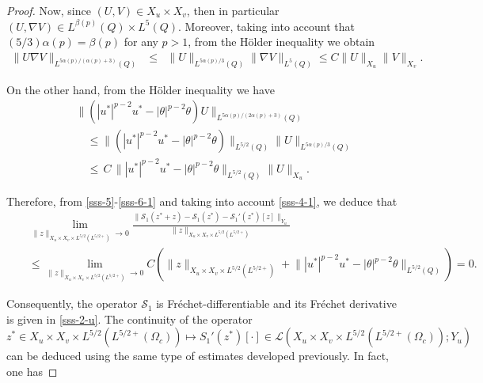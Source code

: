 \documentclass[10pt,a4paper]{amsart}
\begin{document}
\begin{proof}
 Now, since $(U, V)\in X_u\times X_v$, then in particular $(U,\nabla V)\in L^{\beta(p)}(Q)\times L^5(Q)$. 
 Moreover, taking into account that $(5/3)\alpha(p)=\beta(p)$ for any $p>1$, 
 from the H\"older inequality we obtain
\begin{eqnarray}
\|U\nabla V \|_{ L^{5\alpha(p)/(\alpha(p)+3)}(Q)}
&\leq& 
\|U\|_{L^{5\alpha(p)/3}(Q)}\|\nabla V\|_{L^{5}(Q)}
\le C\|U\|_{{X}_{ u}}\|V\|_{{X}_{ v}}.
\label{sss-6}
\end{eqnarray}


On the other hand, 
from the H\"older inequality we have
%
\begin{eqnarray}
&&
\|( |u^*|^{p-2} u^* - |\theta|^{p-2}\theta )U\|_{L^{5\alpha(p)/(2\alpha(p)+3)}(Q)}
 \nonumber \\
&& \quad \le \|( |u^*|^{p-2} u^* - |\theta|^{p-2}\theta )\|_{L^{5/2}(Q)} 
 \|U\|_{L^{5\alpha(p)/3}(Q)}
\nonumber \\
 &&\quad \le   \,  C \,  \| |u^*|^{p-2} u^* - |\theta|^{p-2}\theta \|_{L^{5/2}(Q)}\|U\|_{X_u}.
\label{sss-6-1}
\end{eqnarray}

%
Therefore, from \eqref{sss-5}-\eqref{sss-6-1}  
and taking into account \eqref{sss-4-1}, we deduce that
\begin{eqnarray*}
&&\lim_{\| z \|_{{X}_{u}\times {X}_{v}
\times L^{5/2}(L^{5/2+})} \to0}
\frac{\|\mathcal{S}_1(z^*+z)-\mathcal{S}_1(z^*)-\mathcal{S}_1'(z^*)[z]\|_{Y_u}}
{\|z \|_{ {X}_{ u}\times {X}_{v}
\times L^{5/2}(L^{5/2+})}}\\
&&
 \le \lim_{\| z \|_{{X}_{ u}\times{X}_{v}\times L^{5/2}(L^{5/2+})} \to0}
C \left(\| z \|_{{X}_{u}\times{X}_{v}
\!\times L^{5/2}(L^{5/2+})}
+
\!\| |u^*|^{p-2} u^* - |\theta|^{p-2}\theta \|_{L^{ 5/2}(Q)}\right)=0.
\end{eqnarray*}


Consequently, the operator $\mathcal{S}_1$ is Fr\'echet-differentiable and its Fr\'echet derivative is given in
\eqref{sss-2-u}. The continuity of the operator 
$$z^*\in X_u\times X_v\times L^{5/2}(L^{5/2+}(\Omega_c)) \longmapsto S_1'(z^*)[\cdot]\in  \mathcal{L}(X_u\times X_v\times L^{5/2}(L^{5/2+}(\Omega_c));Y_u)$$ can be deduced using the same type of estimates developed previously. In fact, one has


\end{proof}
\end{document}
